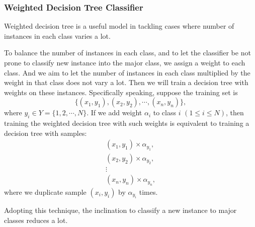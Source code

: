 \documentclass[english]{article}
\begin{document}
\subsubsection{Weighted Decision Tree Classifier}
\label{weightdtc}
\par Weighted decision tree is a useful model in tackling cases where number of instances in each class varies a lot.
\par To balance the number of instances in each class, and to let the classifier be not prone to classify new instance into the major class, we assign a weight to each class. And we aim to let the number of instances in each class multiplied by the weight in that class does not vary a lot. Then we will train a decision tree with weights on these instances. Specifically speaking, suppose the training set is 
\begin{equation}
	\{(x_{1}, y_{1}), (x_{2}, y_{2}), \cdots, (x_{n}, y_{n})\},
\end{equation}
where $y_{i}\in Y = \{1, 2, \cdots, N\}$. If we add weight $\alpha_{i}$ to class $i$ $(1\le i\le N)$, then training the weighted decision tree with such weights is equivalent to training a decision tree with samples:
\begin{equation}
	\begin{matrix}
		(x_{1}, y_{1})\times \alpha_{y_{1}},\\
		(x_{2}, y_{2})\times \alpha_{y_{2}},\\
		\vdots\\
		(x_{n}, y_{n})\times \alpha_{y_{n}},
	\end{matrix}
\end{equation}
where we duplicate sample $(x_{i}, y_{i})$ by $\alpha_{y_{i}}$ times.
\par Adopting this technique, the inclination to classify a new instance to major classes reduces a lot.
\end{document}
